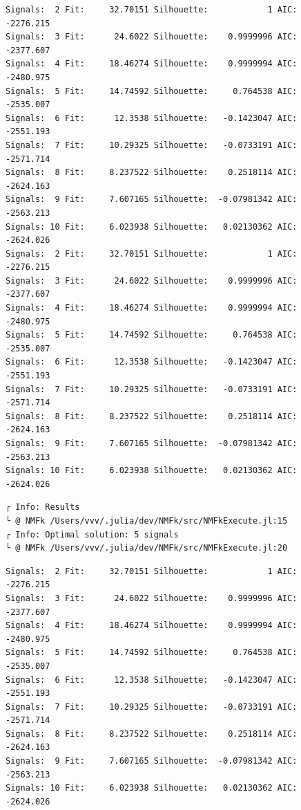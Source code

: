 \documentclass[11pt]{article}
\begin{document}
    \begin{Verbatim}[commandchars=\\\{\}]
Signals:  2 Fit:     32.70151 Silhouette:            1 AIC:    -2276.215
Signals:  3 Fit:      24.6022 Silhouette:    0.9999996 AIC:    -2377.607
Signals:  4 Fit:     18.46274 Silhouette:    0.9999994 AIC:    -2480.975
Signals:  5 Fit:     14.74592 Silhouette:     0.764538 AIC:    -2535.007
Signals:  6 Fit:      12.3538 Silhouette:   -0.1423047 AIC:    -2551.193
Signals:  7 Fit:     10.29325 Silhouette:   -0.0733191 AIC:    -2571.714
Signals:  8 Fit:     8.237522 Silhouette:    0.2518114 AIC:    -2624.163
Signals:  9 Fit:     7.607165 Silhouette:  -0.07981342 AIC:    -2563.213
Signals: 10 Fit:     6.023938 Silhouette:   0.02130362 AIC:    -2624.026
Signals:  2 Fit:     32.70151 Silhouette:            1 AIC:    -2276.215
Signals:  3 Fit:      24.6022 Silhouette:    0.9999996 AIC:    -2377.607
Signals:  4 Fit:     18.46274 Silhouette:    0.9999994 AIC:    -2480.975
Signals:  5 Fit:     14.74592 Silhouette:     0.764538 AIC:    -2535.007
Signals:  6 Fit:      12.3538 Silhouette:   -0.1423047 AIC:    -2551.193
Signals:  7 Fit:     10.29325 Silhouette:   -0.0733191 AIC:    -2571.714
Signals:  8 Fit:     8.237522 Silhouette:    0.2518114 AIC:    -2624.163
Signals:  9 Fit:     7.607165 Silhouette:  -0.07981342 AIC:    -2563.213
Signals: 10 Fit:     6.023938 Silhouette:   0.02130362 AIC:    -2624.026
    \end{Verbatim}

    \begin{Verbatim}[commandchars=\\\{\}]
┌ Info: Results
└ @ NMFk /Users/vvv/.julia/dev/NMFk/src/NMFkExecute.jl:15
┌ Info: Optimal solution: 5 signals
└ @ NMFk /Users/vvv/.julia/dev/NMFk/src/NMFkExecute.jl:20
    \end{Verbatim}

    \begin{Verbatim}[commandchars=\\\{\}]
Signals:  2 Fit:     32.70151 Silhouette:            1 AIC:    -2276.215
Signals:  3 Fit:      24.6022 Silhouette:    0.9999996 AIC:    -2377.607
Signals:  4 Fit:     18.46274 Silhouette:    0.9999994 AIC:    -2480.975
Signals:  5 Fit:     14.74592 Silhouette:     0.764538 AIC:    -2535.007
Signals:  6 Fit:      12.3538 Silhouette:   -0.1423047 AIC:    -2551.193
Signals:  7 Fit:     10.29325 Silhouette:   -0.0733191 AIC:    -2571.714
Signals:  8 Fit:     8.237522 Silhouette:    0.2518114 AIC:    -2624.163
Signals:  9 Fit:     7.607165 Silhouette:  -0.07981342 AIC:    -2563.213
Signals: 10 Fit:     6.023938 Silhouette:   0.02130362 AIC:    -2624.026
    \end{Verbatim}
\end{document}
